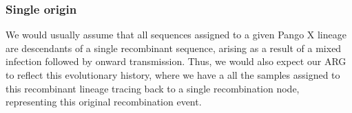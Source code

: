 \documentclass{article}
\begin{document}




\subsubsection{Single origin}
We would usually assume that all sequences
assigned to a given Pango X lineage are descendants of a single recombinant
sequence, arising as a result of a mixed infection followed by onward
transmission. Thus, we would also expect our ARG to reflect this evolutionary
history, where we have a all the samples assigned to this recombinant lineage
tracing back to a single recombination node, representing this original
recombination event.
\end{document}
